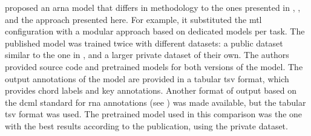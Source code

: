 
\textcite{mcleod2021modular} proposed an \gls{arna} model
that differs in methodology to the ones presented in
\textcite{chen2021attend}, \textcite{micchi2021deep}, and
the approach presented here. For example, it substituted the
\gls{mtl} configuration with a modular approach based on
dedicated models per task. The published model was trained
twice with different datasets: a public dataset similar to
the one in \textcite{micchi2021deep}, and a larger private
dataset of their own. The authors provided source code and
pretrained models for both versions of the model. The output
annotations of the model are provided in a tabular \gls{tsv}
format, which provides chord labels and key annotations.
Another format of output based on the \gls{dcml} standard
for \gls{rna} annotations (see
) was made available, but the
tabular \gls{tsv} format was used. The pretrained model used
in this comparison was the one with the best results
according to the publication, using the private dataset.
